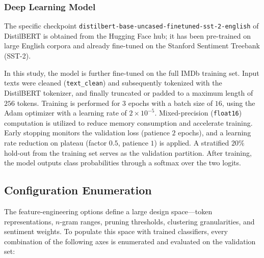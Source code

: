 \documentclass[a4paper,twoside,12pt]{book}
\newcommand{\code}[1]{\texttt{#1}}
\begin{document}
\subsubsection{Deep Learning Model} \label{sec:distilbert_model}

The specific checkpoint \code{distilbert-base-uncased-finetuned-sst-2-english} of DistilBERT is obtained from the Hugging Face hub; it has been pre-trained on large English corpora and already fine-tuned on the Stanford Sentiment Treebank (SST-2).

In this study, the model is further fine-tuned on the full IMDb training set. Input texts were cleaned (\code{text\_clean}) and subsequently tokenized with the DistilBERT tokenizer, and finally truncated or padded to a maximum length of $256$ tokens. Training is performed for $3$ epochs with a batch size of $16$, using the Adam optimizer with a learning rate of $2 \times 10^{-5}$. Mixed-precision (\code{float16}) computation is utilized to reduce memory consumption and accelerate training. Early stopping monitors the validation loss (patience $2$ epochs), and a learning rate reduction on plateau (factor $0.5$, patience $1$) is applied. A stratified $20\%$ hold-out from the training set serves as the validation partition. After training, the model outputs class probabilities through a softmax over the two logits.

\subsection{Configuration Enumeration}
\label{sec:config_enum}

The feature-engineering options define a large design space---token representations, $n$-gram ranges, pruning thresholds, clustering granularities, and sentiment weights. To populate this space with trained classifiers, every combination of the following axes is enumerated and evaluated on the validation set:
\end{document}
